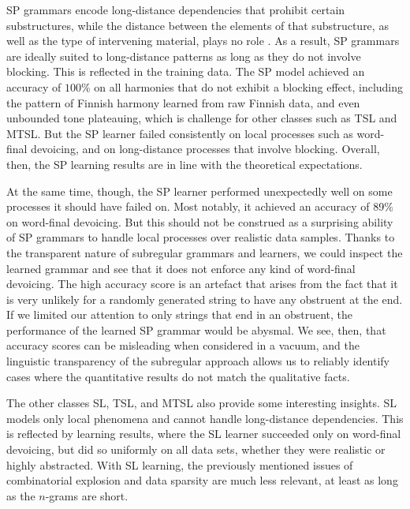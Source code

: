 SP grammars encode long-distance dependencies that prohibit certain substructures, while the distance between the elements of that substructure, as well as the type of intervening material, plays no role \citep{HeinzRogers2010SPdist,Heinz-2010-SEL}.
As a result, SP grammars are ideally suited to long-distance patterns as long as they do not involve blocking.
This is reflected in the training data.
The SP model achieved an accuracy of $100\%$ on all harmonies that do not exhibit a blocking effect, including the pattern of Finnish harmony learned from raw Finnish data, and even unbounded tone plateauing, which is challenge for other classes such as TSL and MTSL\@.
But the SP learner failed consistently on local processes such as word-final devoicing, and on long-distance processes that involve blocking.
Overall, then, the SP learning results are in line with the theoretical expectations.

At the same time, though, the SP learner performed unexpectedly well on some processes it should have failed on.
Most notably, it achieved an accuracy of 89\% on word-final devoicing.
But this should not be construed as a surprising ability of SP grammars to handle local processes over realistic data samples.
Thanks to the transparent nature of subregular grammars and learners, we could inspect the learned grammar and see that it does not enforce any kind of word-final devoicing.
The high accuracy score is an artefact that arises from the fact that it is very unlikely for a randomly generated string to have any obstruent at the end.
If we limited our attention to only strings that end in an obstruent, the performance of the learned SP grammar would be abysmal.
We see, then, that accuracy scores can be misleading when considered in a vacuum, and the linguistic transparency of the subregular approach allows us to reliably identify cases where the quantitative results do not match the qualitative facts.

The other classes SL, TSL, and MTSL also provide some interesting insights.
SL models only local phenomena and cannot handle long-distance dependencies.
This is reflected by learning results, where the SL learner succeeded only on word-final devoicing, but did so uniformly on all data sets, whether they were realistic or highly abstracted.
With SL learning, the previously mentioned issues of combinatorial explosion and data sparsity are much less relevant, at least as long as the $n$-grams are short.


